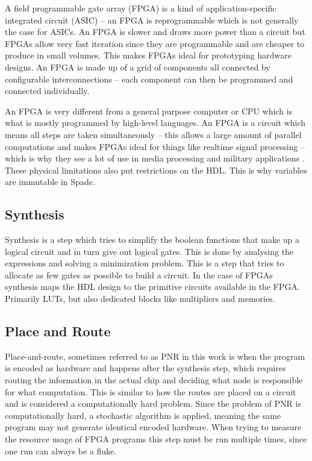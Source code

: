A field programmable gate array (FPGA) is a kind of application-specific integrated circuit (ASIC) -- an FPGA is reprogrammable which is not generally the case for ASICs. An FPGA is slower and draws more power than a  circuit but FPGAs allow very fast iteration since they are programmable and are cheaper to produce in small volumes. This makes FPGAs ideal for prototyping hardware designs. An FPGA is made up of a grid of components all connected by configurable interconnections -- each component can then be programmed and connected individually. \cite{src:FPGA}

An FPGA is very different from a general purpose computer or CPU which is what is mostly programmed by high-level languages. An FPGA is a circuit which means all steps are taken simultaneously -- this allows a large amount of parallel computations and makes FPGAs ideal for things like realtime signal processing -- which is why they see a lot of use in media processing and military applications \cite{src:FPGAApplications}. These physical limitations also put restrictions on the HDL. This is why variables are immutable in Spade.

\subsection{Synthesis}
Synthesis is a step which tries to simplify the boolean functions that make up a logical circuit and in turn give out logical gates. This is done by analysing the expressions and solving a minimization problem. This is a step that tries to allocate as few gates as possible to build a circuit. In the case of FPGAs synthesis maps the HDL design to the primitive circuits available in the FPGA. Primarily LUTs, but also dedicated blocks like multipliers and memories.

\subsection{Place and Route}
Place-and-route, sometimes referred to as PNR in this work is when the program is encoded as hardware and happens after the synthesis step, which requires routing the information in the actual chip and deciding what node is responsible for what computation. This is similar to how the routes are placed on a  circuit and is considered a computationally hard problem. Since the problem of PNR is computationally hard, a stochastic algorithm is applied, meaning the same program may not generate identical encoded hardware. When trying to measure the resource usage of FPGA programs this step must be run multiple times, since one run can always be a fluke.
